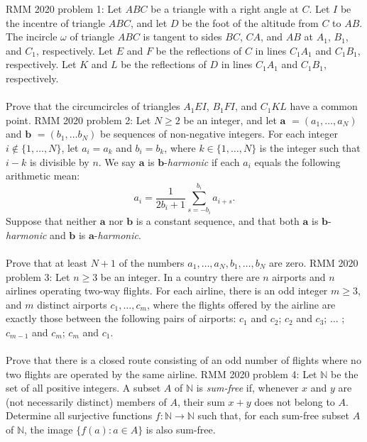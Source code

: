 RMM 2020 problem 1:  Let $ABC$ be a triangle with a right angle at $C$. Let $I$ be the incentre of triangle $ABC$, and let $D$ be the foot of the altitude from $C$ to $AB$. The incircle $\omega$ of triangle $ABC$ is tangent to sides $BC$, $CA$, and $AB$ at $A_1$, $B_1$, and $C_1$, respectively. Let $E$ and $F$ be the reflections of $C$ in lines $C_1A_1$ and $C_1B_1$, respectively. Let $K$ and $L$ be the reflections of $D$ in lines $C_1A_1$ and $C_1B_1$, respectively. \\\\
Prove that the circumcircles of triangles $A_1EI$, $B_1FI$, and $C_1KL$ have a common point. 
RMM 2020 problem 2:  Let $N \geq 2$ be an integer, and let $\mathbf a$ $= (a_1, \ldots, a_N)$ and $\mathbf b$ $= (b_1, \ldots b_N)$ be sequences of non-negative integers. For each integer $i \not \in \{1, \ldots, N\}$, let $a_i = a_k$ and $b_i = b_k$, where $k \in \{1, \ldots, N\}$ is the integer such that $i-k$ is divisible by $n$. We say $\mathbf a$ is $\mathbf b$-\textit{harmonic} if each $a_i$ equals the following arithmetic mean:
\[ a_i = \frac{1}{2b_i+1} \sum_{s=-b_i}^{b_i} a_{i+s}. \]
Suppose that neither $\mathbf a $ nor $\mathbf b$ is a constant sequence, and that both $\mathbf a$ is $\mathbf b$-\textit{harmonic} and $\mathbf b$ is $\mathbf a$-\textit{harmonic}. \\\\
Prove that at least $N+1$ of the numbers $a_1, \ldots, a_N,b_1, \ldots, b_N$ are zero. 
RMM 2020 problem 3:  Let $n\ge 3$ be an integer. In a country there are $n$ airports and $n$ airlines operating two-way flights. For each airline, there is an odd integer $m\ge 3$, and $m$ distinct airports $c_1, \dots, c_m$, where the flights offered by the airline are exactly those between the following pairs of airports: $c_1$ and $c_2$; $c_2$ and $c_3$; $\dots$ ; $c_{m-1}$ and $c_m$; $c_m$ and $c_1$. \\\\
Prove that there is a closed route consisting of an odd number of flights where no two flights are operated by the same airline. 
RMM 2020 problem 4:  Let $\mathbb N$ be the set of all positive integers. A subset $A$ of $\mathbb N$ is \textit{sum-free} if, whenever $x$ and $y$ are (not necessarily distinct) members of $A$,  their sum $x+y$ does not belong to $A$. Determine all surjective functions $f:\mathbb N\to\mathbb N$ such that, for each sum-free subset $A$ of $\mathbb N$, the image $\{f(a):a\in A\}$ is also sum-free. \\\\
